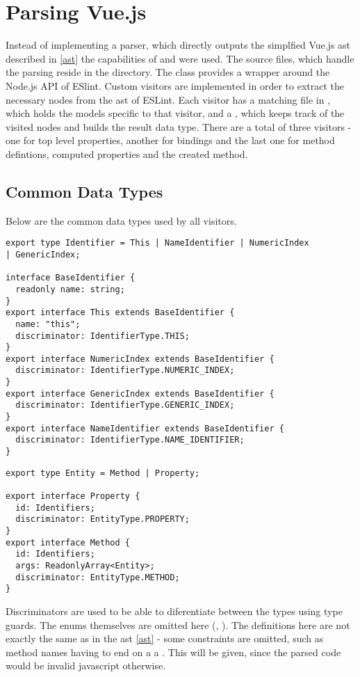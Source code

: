 \section{Parsing Vue.js}

Instead of implementing a parser, which directly outputs the simplfied Vue.js \gls{ast} described in \ref{ast} the capabilities of \textcite{eslintMainPage}  %
and \parencite{eslint_vue_parser} were used. 
The source files, which handle the parsing reside in the  directory.
The  class provides a wrapper around the Node.js API of ESlint. Custom visitors are implemented in order to extract the necessary nodes from the \gls{ast} of ESLint. Each visitor has a matching file in , which holds the models specific to that visitor, and a , which keeps track of the visited nodes and builds the result data type. There are a total of three visitors - one for top level properties, another for bindings and the last one for method defintions, computed properties and the created method.
 
\subsection{Common Data Types}
Below are the common data types used by all visitors.
\begin{lstlisting}
export type Identifier = This | NameIdentifier | NumericIndex 
| GenericIndex;

interface BaseIdentifier {
  readonly name: string;
}
export interface This extends BaseIdentifier {
  name: "this";
  discriminator: IdentifierType.THIS;
}
export interface NumericIndex extends BaseIdentifier {
  discriminator: IdentifierType.NUMERIC_INDEX;
}
export interface GenericIndex extends BaseIdentifier {
  discriminator: IdentifierType.GENERIC_INDEX;
}
export interface NameIdentifier extends BaseIdentifier {
  discriminator: IdentifierType.NAME_IDENTIFIER;
}
\end{lstlisting}

\begin{lstlisting} 
export type Entity = Method | Property;

export interface Property {
  id: Identifiers;
  discriminator: EntityType.PROPERTY;
}
export interface Method {
  id: Identifiers;
  args: ReadonlyArray<Entity>;
  discriminator: EntityType.METHOD;
}
\end{lstlisting}
Discriminators are used to be able to diferentiate between the types using type guards. The enums themselves are omitted here (, ). The definitions here are not exactly the same as in the \gls{ast} \ref{ast} - some constraints are omitted, such as method names having to end on a a . This will be given, since the parsed code would be invalid javascript otherwise.
